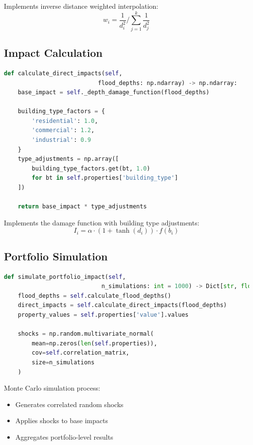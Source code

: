 \documentclass{article}
\begin{document}
Implements inverse distance weighted interpolation:
\begin{equation}
w_i = \frac{1}{d_i^2} / \sum_{j=1}^k \frac{1}{d_j^2}
\end{equation}

\subsection{Impact Calculation}
\begin{lstlisting}[language=Python]
def calculate_direct_impacts(self, 
                           flood_depths: np.ndarray) -> np.ndarray:
    base_impact = self._depth_damage_function(flood_depths)
    
    building_type_factors = {
        'residential': 1.0,
        'commercial': 1.2,
        'industrial': 0.9
    }
    type_adjustments = np.array([
        building_type_factors.get(bt, 1.0) 
        for bt in self.properties['building_type']
    ])
    
    return base_impact * type_adjustments
\end{lstlisting}

Implements the damage function with building type adjustments:
\begin{equation}
I_i = \alpha \cdot (1 + \tanh(d_i)) \cdot f(b_i)
\end{equation}

\subsection{Portfolio Simulation}
\begin{lstlisting}[language=Python]
def simulate_portfolio_impact(self, 
                            n_simulations: int = 1000) -> Dict[str, float]:
    flood_depths = self.calculate_flood_depths()
    direct_impacts = self.calculate_direct_impacts(flood_depths)
    property_values = self.properties['value'].values
    
    shocks = np.random.multivariate_normal(
        mean=np.zeros(len(self.properties)),
        cov=self.correlation_matrix,
        size=n_simulations
    )
\end{lstlisting}

Monte Carlo simulation process:
\begin{itemize}
    \item Generates correlated random shocks
    \item Applies shocks to base impacts
    \item Aggregates portfolio-level results
\end{itemize}
\end{document}
